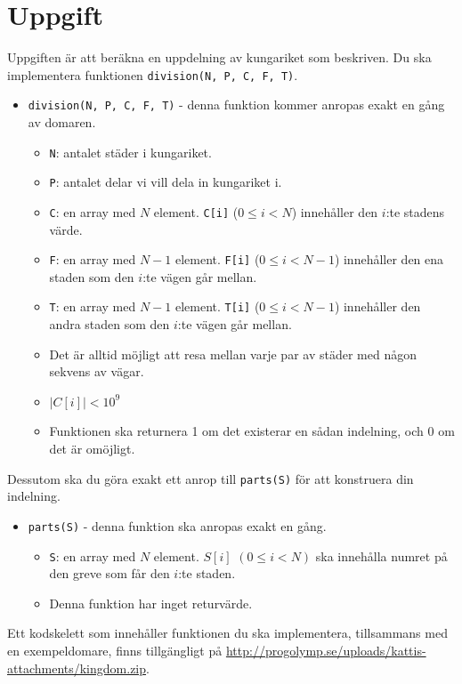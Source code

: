 \section*{Uppgift}
Uppgiften är att beräkna en uppdelning av kungariket som beskriven. Du ska implementera funktionen
\texttt{division(N, P, C, F, T)}.

\begin{itemize}
  \item \texttt{division(N, P, C, F, T)} - denna funktion kommer anropas exakt en gång av domaren.
  \begin{itemize}
    \item \texttt{N}: antalet städer i kungariket.
    \item \texttt{P}: antalet delar vi vill dela in kungariket i.
    \item \texttt{C}: en array med $N$ element. \texttt{C[i]} ($0 \le i < N$) innehåller den $i$:te stadens värde.
    \item \texttt{F}: en array med $N - 1$ element. \texttt{F[i]} ($0 \le i < N - 1$) innehåller den ena staden som den $i$:te vägen går mellan.
    \item \texttt{T}: en array med $N - 1$ element. \texttt{T[i]} ($0 \le i < N - 1$) innehåller den andra staden som den $i$:te vägen går mellan.
    \item Det är alltid möjligt att resa mellan varje par av städer med någon sekvens av vägar.
    \item $|C[i]| < 10^9$
    \item Funktionen ska returnera 1 om det existerar en sådan indelning, och 0 om det är omöjligt.
  \end{itemize}
\end{itemize}

Dessutom ska du göra exakt ett anrop till \texttt{parts(S)} för att konstruera din indelning.
\begin{itemize}
  \item \texttt{parts(S)} - denna funktion ska anropas exakt en gång.
  \begin{itemize}
    \item \texttt{S}: en array med $N$ element. $S[i]$ $(0 \le i < N)$ ska innehålla numret på den greve som får den $i$:te staden.
    \item Denna funktion har inget returvärde.
  \end{itemize}
\end{itemize}

Ett kodskelett som innehåller funktionen du ska implementera, tillsammans med en exempeldomare, finns tillgängligt på
\url{http://progolymp.se/uploads/kattis-attachments/kingdom.zip}.

